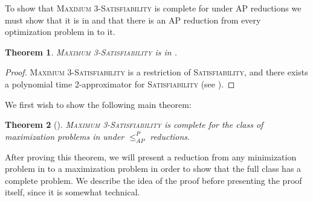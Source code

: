 \documentclass[]{article}
\theoremstyle{plain}
\newtheorem{theorem}{Theorem}
\theoremstyle{definition}
\newcommand{\APr}{\leq_{AP}^{P}}
\begin{document}
To show that \textsc{Maximum 3-Satisfiability} is complete for \APX{} under AP reductions we must show that it is in \APX{} and that there is an AP reduction from every optimization problem in \APX{} to it.

\begin{theorem}
  \textsc{Maximum 3-Satisfiability} is in \APX.
\end{theorem}
\begin{proof}
  \textsc{Maximum 3-Satisfiability} is a restriction of \textsc{Satisfiability}, and there exists a polynomial time 2-approximator for \textsc{Satisfiability} (see \cite[Program~3.1]{book}).
\end{proof}

We first wish to show the following main theorem:

\begin{theorem}[{\cite[Theorem~8.6]{book}}]\label{thm:maxcomplete}
  \textsc{Maximum 3-Satisfiability} is complete for the class of maximization problems in \APX{} under $\APr$ reductions.
\end{theorem}

After proving this theorem, we will present a reduction from any minimization problem in \APX{} to a maximization problem in order to show that the full class \APX{} has a complete problem.
We describe the idea of the proof before presenting the proof itself, since it is somewhat technical.
\end{document}
